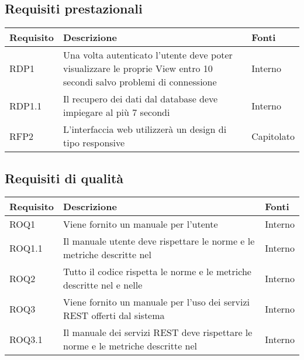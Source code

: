 \subsection{Requisiti prestazionali}

\begin{center}

	\def\arraystretch{1.5}
	\bgroup
	\begin{longtable}{| p{2.5cm} | p{8cm} | p{2cm} |}

		\hline
		\textbf{Requisito} & \textbf{Descrizione} & \textbf{Fonti} \\
		\hline

		RDP1  &  Una volta autenticato l'utente deve poter visualizzare le proprie View entro 10 secondi salvo problemi di connessione &  Interno \\
		\hline
		RDP1.1  &  Il recupero dei dati dal database deve impiegare al più 7 secondi  &  Interno \\
		\hline
		RFP2  &  L'interfaccia web utilizzerà un design di tipo responsive  &  Capitolato \\
		\hline

	\end{longtable}
	\egroup
\end{center}

\subsection{Requisiti di qualità}

\begin{center}

	\def\arraystretch{1.5}
	\bgroup
	\begin{longtable}{| p{2.5cm} | p{8cm} | p{2cm} |}

		\hline
		\textbf{Requisito} & \textbf{Descrizione} & \textbf{Fonti} \\
		\hline

		ROQ1  &  Viene fornito un manuale per l'utente  &  Interno \\
		\hline
		ROQ1.1  &  Il manuale utente deve rispettare le norme e le metriche descritte nel \docNameVersionPdQ  &  Interno \\
		\hline
		ROQ2  &  Tutto il codice rispetta le norme e le metriche descritte nel \docNameVersionPdQ{} e nelle \docNameVersionNdP  &  Interno \\
		\hline
		ROQ3  &  Viene fornito un manuale per l'uso dei servizi REST offerti dal sistema  &  Interno \\
		\hline
		ROQ3.1  &  Il manuale dei servizi REST deve rispettare le norme e le metriche descritte nel \docNameVersionPdQ  &  Interno \\
		\hline


	\end{longtable}
	\egroup
\end{center}


